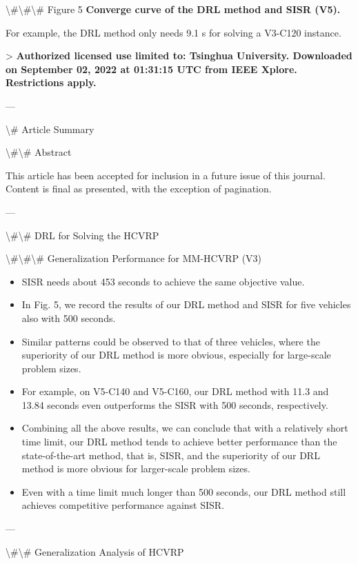 \documentclass{article}
\begin{document}
	\textbackslash{}#\textbackslash{}#\textbackslash{}# Figure 5
	\textbf{Converge curve of the DRL method and SISR (V5).}
	
	For example, the DRL method only needs 9.1 s for solving a V3-C120 instance.
	
	> \textbf{Authorized licensed use limited to: Tsinghua University. Downloaded on September 02, 2022 at 01:31:15 UTC from IEEE Xplore. Restrictions apply.}
	
	---
	
	\textbackslash{}# Article Summary
	
	\textbackslash{}#\textbackslash{}# Abstract
	
	This article has been accepted for inclusion in a future issue of this journal. Content is final as presented, with the exception of pagination.
	
	---
	
	\textbackslash{}#\textbackslash{}# DRL for Solving the HCVRP
	
	\textbackslash{}#\textbackslash{}#\textbackslash{}# Generalization Performance for MM-HCVRP (V3)
	
	\begin{itemize}
		\item SISR needs about 453 seconds to achieve the same objective value.
		\item In Fig. 5, we record the results of our DRL method and SISR for five vehicles also with 500 seconds.
		\item Similar patterns could be observed to that of three vehicles, where the superiority of our DRL method is more obvious, especially for large-scale problem sizes.
		\item For example, on V5-C140 and V5-C160, our DRL method with 11.3 and 13.84 seconds even outperforms the SISR with 500 seconds, respectively.
		\item Combining all the above results, we can conclude that with a relatively short time limit, our DRL method tends to achieve better performance than the state-of-the-art method, that is, SISR, and the superiority of our DRL method is more obvious for larger-scale problem sizes.
		\item Even with a time limit much longer than 500 seconds, our DRL method still achieves competitive performance against SISR.
	\end{itemize}
	
	---
	
	\textbackslash{}#\textbackslash{}# Generalization Analysis of HCVRP
	
\end{document}
